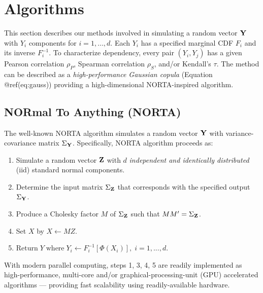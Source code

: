 \documentclass[
]{jss}
\providecommand{\tightlist}{%
  \setlength{\itemsep}{0pt}\setlength{\parskip}{0pt}}
\begin{document}
\hypertarget{algorithms}{%
\section{Algorithms}\label{algorithms}}

This section describes our methods involved in simulating a random
vector \(\bf Y\) with \(Y_i\) components for \(i=1,\ldots,d\). Each
\(Y_i\) has a specified marginal CDF \(F_i\) and its inverse
\(F^{-1}_i\). To characterize dependency, every pair \((Y_i, Y_j)\) has
a given Pearson correlation \(\rho_P\), Spearman correlation \(\rho_S\),
and/or Kendall's \(\tau\). The method can be described as a
\emph{high-performance Gaussian copula} (Equation @ref(eq:gauss))
providing a high-dimensional NORTA-inspired algorithm.

\hypertarget{normal-to-anything-norta}{%
\subsection{NORmal To Anything (NORTA)}\label{normal-to-anything-norta}}

The well-known NORTA algorithm \citep{Cario1997} simulates a random
vector \(\bf Y\) with variance-covariance matrix \(\Sigma_{\bf Y}\).
Specifically, NORTA algorithm proceeds as:


\begin{enumerate}
\def\labelenumi{\arabic{enumi}.}
\tightlist
\item
  Simulate a random vector \(\bf Z\) with \(d\) \emph{independent and
  identically distributed} (iid) standard normal components.
\item
  Determine the input matrix \(\Sigma_{\bf Z}\) that corresponds with
  the specified output \(\Sigma_{\bf Y}\).
\item
  Produce a Cholesky factor \(M\) of \(\Sigma_{\bf Z}\) such that
  \(M M^{\prime}=\Sigma_{\bf Z}\).
\item
  Set \(X\) by \(X \gets MZ\).
\item
  \(\text{Return} \; Y \; \text{where} \; Y_i \gets F_i^{-1}[\Phi(X_i)], \; i=1,...,d\).
\end{enumerate}


With modern parallel computing, steps 1, 3, 4, 5 are readily implemented
as high-performance, multi-core and/or graphical-processing-unit (GPU)
accelerated algorithms --- providing fast scalability using
readily-available hardware.
\end{document}
